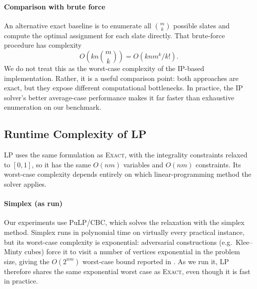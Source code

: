 \documentclass[11pt]{article}
\newcommand{\Exact}{\textsc{Exact}}
\newcommand{\LP}{\textsc{LP}}
\begin{document}
\paragraph{Comparison with brute force} An alternative exact baseline is to enumerate all \(\binom{m}{k}\) possible slates and compute the optimal assignment for each slate directly. That brute-force procedure has complexity
\[
O\!\left(k n \binom{m}{k}\right)
=
O(knm^k/k!).
\]
We do not treat this as the worst-case complexity of the IP-based implementation. Rather, it is a useful comparison point: both approaches are exact, but they expose different computational bottlenecks. In practice, the IP solver's better average-case performance makes it far faster than exhaustive enumeration on our benchmark.


\subsection{Runtime Complexity of \LP{}}
\label{app:lp-complexity}
\LP{} uses the same formulation as \Exact{}, with the integrality constraints relaxed to $[0,1]$, so it has the same $O(nm)$ variables and $O(nm)$ constraints. Its worst-case complexity depends entirely on which linear-programming method the solver applies.

\paragraph{Simplex (as run)} Our experiments use PuLP/CBC, which solves the relaxation with the simplex method. Simplex runs in polynomial time on virtually every practical instance, but its worst-case complexity is exponential: adversarial constructions (e.g.\ Klee--Minty cubes) force it to visit a number of vertices exponential in the problem size, giving the $O(2^{nm})$ worst-case bound reported in . As we run it, \LP{} therefore shares the same exponential worst case as \Exact{}, even though it is fast in practice.
\end{document}
